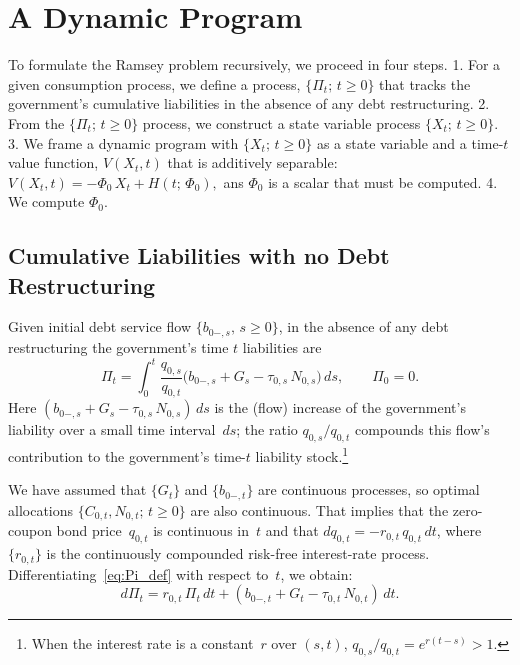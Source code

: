 \documentclass[12pt]{article}
\newcommand{\NW}[1]{{\textcolor{blue}{#1}}}
\begin{document}
{%
\section{A Dynamic Program}\label{sec:DP}

{To formulate the Ramsey problem recursively, %
we proceed in four steps. 1. For a given consumption process, we define  a process, $\{\Pi_t;\, t \ge 0\}$ that tracks the government's cumulative liabilities in the absence of any debt restructuring. 2. From the  $\{\Pi_t;\, t \ge 0\}$ process, we   construct a state variable process $\{X_t;\, t \ge 0\}$. 3. We frame  a dynamic program with $\{X_t;\, t \ge 0\}$ as a state variable and a  time-$t$ value function, $V(X_t,t)$ that  is additively separable: $V(X_t,t) = -\Phi_0\, X_t + H(t;\, \Phi_0),$ ans  $\Phi_0$ is a scalar that must be computed.  4. We compute $\Phi_0$. 
} %

\subsection{{Cumulative Liabilities with no Debt Restructuring}}

Given initial debt service flow $\{b_{0-,s},\, s \ge 0\}$, in the absence of any debt restructuring the government's time $t$ liabilities are
\begin{equation}\label{eq:Pi_def}
\Pi_t = \int_0^t \frac{q_{0,s}}{q_{0,t}}\bigl(b_{0-,s}+G_s - \tau_{0,s}\, N_{0,s}\bigr)\, ds, \qquad \Pi_0 = 0.
\end{equation} Here $(b_{0-,s}+G_s-\tau_{0,s}\, N_{0,s})\, ds$ is the (flow) increase of the government's liability over a small time interval~$ds$;
the ratio $q_{0,s}/q_{0,t}$ compounds this flow's contribution to the government's time-$t$ liability stock.\footnote{When the interest rate is a constant~$r$ over $(s,t)$, $q_{0,s}/q_{0,t} = e^{r(t-s)} > 1$.} 

We have assumed that $\{G_t\}$ and $\{b_{0-,t}\}$ are continuous processes, so optimal allocations $\{C_{0,t}, N_{0,t};\, t \ge 0\}$ are also continuous. That implies that the zero-coupon bond price~$q_{0,t}$ is continuous in~$t$ and %
that  $dq_{0,t} = -r_{0,t}\, q_{0,t}\, dt$, where $\{r_{0,t}\}$ is the continuously compounded risk-free interest-rate process. Differentiating~\eqref{eq:Pi_def} with respect to~$t$, we obtain:
\begin{equation}\label{eq:dPi}
d\Pi_t = r_{0,t}\, \Pi_t\, dt + (b_{0-,t}+G_t - \tau_{0,t}\, N_{0,t})\, dt.
\end{equation}
%

}
\end{document}
